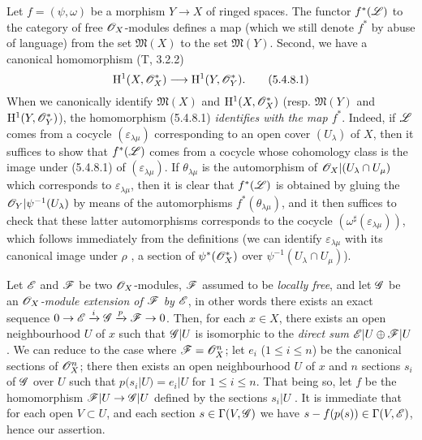 \begin{env}[5.4.8]
\label{0.5.4.8}
Let $f=(\psi,\omega)$ be a morphism $Y\to X$ of ringed spaces.
The functor $f^*(\mathscr{L})$ to the category of free $\mathscr{O}_X$-modules defines a map (which we still denote $f^*$ by abuse of language) from the set $\mathfrak{M}(X)$ to the set $\mathfrak{M}(Y)$.
Second, we have a canonical homomorphism (T, 3.2.2)
\[
  \HH^1(X,\sh{O}_X^*)\to\HH^1(Y,\sh{O}_Y^*).
  \tag{5.4.8.1}
\]
When we canonically identify  $\mathfrak{M}(X)$ and $\mathrm{H}^1(X,\mathscr{O}_X^*)$ (resp. $\mathfrak{M}(Y)$ and $\mathrm{H}^1(Y,\mathscr{O}_Y^*)$), the homomorphism (5.4.8.1) \emph{identifies with the map $f^*$}.
Indeed, if $\mathscr{L}$ comes from a cocycle $(\varepsilon_{\lambda\mu})$ corresponding to an open cover $(U_\lambda)$ of $X$, then it suffices to show that $f^*(\mathscr{L})$ comes from a cocycle whose cohomology class is the image under (5.4.8.1) of $(\varepsilon_{\lambda\mu})$.
If $\theta_{\lambda\mu}$ is the automorphism of $\mathscr{O}_X|(U_\lambda\cap U_\mu)$ which corresponds to $\varepsilon_{\lambda\mu}$, then it is clear that $f^*(\mathscr{L})$ is obtained by gluing the $\mathscr{O}_Y|\psi^{-1}(U_\lambda)$ by means of the automorphisms $f^*(\theta_{\lambda\mu})$, and it then suffices to check that these latter automorphisms corresponds to the cocycle $(\omega^\sharp(\varepsilon_{\lambda\mu}))$, which follows immediately from the definitions (we can identify $\varepsilon_{\lambda\mu}$ with its canonical image under $\rho$ , a section of $\psi^*(\mathscr{O}_X^*)$ over $\psi^{-1}(U_\lambda\cap U_\mu)$).
\end{env}

\begin{env}[5.4.9]
\label{0.5.4.9}
Let $\mathscr{E}$ and $\mathscr{F}$ be two $\mathscr{O}_X$-modules, $\mathscr{F}$ assumed to be \emph{locally free}, and let $\mathscr{G}$ be an \emph{$\mathscr{O}_X$-module extension of $\mathscr{F}$ by $\mathscr{E}$}, in other words there exists an exact sequence $0\to\sh{E}\xrightarrow{i}\sh{G}\xrightarrow{p}\sh{F}\to 0$.
Then, for each $x\in X$, there exists an open neighbourhood $U$ of $x$ such that $\mathscr{G}|U$ is isomorphic to the \emph{direct sum $\mathscr{E}|U\oplus\mathscr{F}|U$}.
We can reduce to the case where $\mathscr{F}=\mathscr{O}_X^n$; let $e_i$ ($1\leq i\leq n$) be the canonical sections  of $\mathscr{O}_X^n$; there then exists an open neighbourhood $U$ of $x$ and $n$ sections $s_i$ of $\mathscr{G}$ over $U$ such that $p(s_i|U)=e_i|U$ for $1\leq i\leq n$.
That being so, let $f$ be the homomorphism $\sh{F}|U\to\sh{G}|U$ defined by the sections $s_i|U$ .
It is immediate that for each open $V\subset U$, and each section $s\in\Gamma(V,\mathscr{G})$ we have $s-f(p(s))\in\Gamma(V,\mathscr{E})$, hence our assertion.
\end{env}

